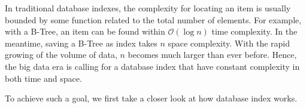In traditional database indexes, the complexity for locating an item is usually bounded by some function related to the total number of elements. For example, with a B-Tree, an item can be found within $\mathcal{O}(\log n)$ time complexity. In the meantime, saving a B-Tree as index takes $n$ space complexity. With the rapid growing of the volume of data, $n$ becomes much larger than ever before. Hence, the big data era is calling for a database index that have constant complexity in both time and space.

To achieve such a goal, we first take a closer look at how database index works. 